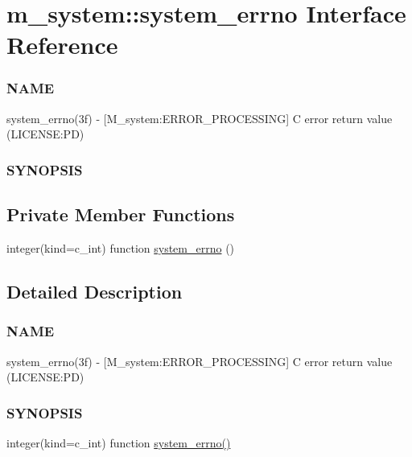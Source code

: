 \hypertarget{interfacem__system_1_1system__errno}{}\section{m\+\_\+system\+:\+:system\+\_\+errno Interface Reference}
\label{interfacem__system_1_1system__errno}


\subsubsection*{N\+A\+ME}

system\+\_\+errno(3f) -\/ \mbox{[}M\+\_\+system\+:E\+R\+R\+O\+R\+\_\+\+P\+R\+O\+C\+E\+S\+S\+I\+NG\mbox{]} C error return value (L\+I\+C\+E\+N\+SE\+:PD) \subsubsection*{S\+Y\+N\+O\+P\+S\+IS} 


\subsection*{Private Member Functions}
\begin{DoxyCompactItemize}
\item 
integer(kind=c\+\_\+int) function \mbox{\hyperlink{interfacem__system_1_1system__errno_a6450910dca7e89b71a84745d95a52d79}{system\+\_\+errno}} ()
\end{DoxyCompactItemize}


\subsection{Detailed Description}
\subsubsection*{N\+A\+ME}

system\+\_\+errno(3f) -\/ \mbox{[}M\+\_\+system\+:E\+R\+R\+O\+R\+\_\+\+P\+R\+O\+C\+E\+S\+S\+I\+NG\mbox{]} C error return value (L\+I\+C\+E\+N\+SE\+:PD) \subsubsection*{S\+Y\+N\+O\+P\+S\+IS}

integer(kind=c\+\_\+int) function \mbox{\hyperlink{interfacem__system_1_1system__errno_a6450910dca7e89b71a84745d95a52d79}{system\+\_\+errno()}}

